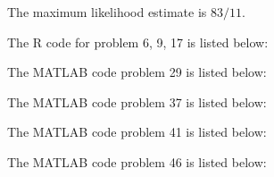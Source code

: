 \documentclass[12pt]{article}
\begin{document}
The maximum likelihood estimate is $83/11$.

\appendix
\appendixpage

The R code for problem 6, 9, 17 is listed below:



The MATLAB code problem 29 is listed below:




The MATLAB code problem 37 is listed below:



The MATLAB code problem 41 is listed below:



The MATLAB code problem 46 is listed below:


\end{document}
